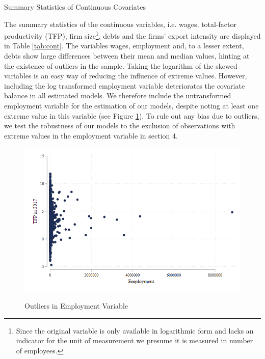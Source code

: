 \documentclass[a4paper,11pt]{scrartcl}
\begin{document}
\begin{table}[h!]
	\centering
	\caption{Summary Statistics of Continuous Covariates} 
	
	\label{tab:cont}
\end{table}
\newpage

The summary statistics of the continuous variables, i.e. wages,  total-factor productivity (TFP), firm size\footnote{Since the original variable is only available in logarithmic form and lacks an indicator for the unit of measurement we presume it is measured in number of employees.}, debts and the firms' export intensity are displayed in Table \ref{tab:cont}. The variables wages, employment and, to a lesser extent, debts show large differences between their mean and median values, hinting at the existence of outliers in the sample. Taking the logarithm of the skewed variables is an easy way of reducing the influence of extreme values. However, including the log transformed employment variable deteriorates the covariate balance in all estimated models. We therefore include the untransformed employment variable for the estimation of our models, despite noting at least one extreme value in this variable (see Figure \ref{fig:outliers}). To rule out any bias due to outliers, we test the robustness of our models to the exclusion of observations with extreme values in the employment variable in section 4.


\begin{figure}[h!]\centering
	\caption{Outliers in Employment Variable}
	\includegraphics[width=\textwidth]{emp15_outliers}
  	\label{fig:outliers}
\end{figure} 
\newpage
\end{document}
